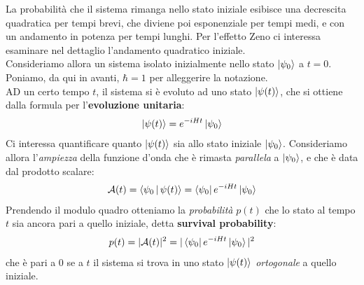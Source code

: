 \documentclass[../../InformazioneQuantistica.tex]{subfiles}
\begin{document}
La probabilità che il sistema rimanga nello stato iniziale esibisce una decrescita quadratica per tempi brevi, che diviene poi esponenziale per tempi medi, e con un andamento in potenza per tempi lunghi. Per l'effetto Zeno ci interessa esaminare nel dettaglio l'andamento quadratico iniziale.\\

Consideriamo allora un sistema isolato inizialmente nello stato $\Ket{\psi_0}$ a $t=0$. Poniamo, da qui in avanti, $\hbar=1$ per alleggerire la notazione.\\
AD un certo tempo $t$, il sistema si è evoluto ad uno stato $\Ket{\psi(t)}$, che si ottiene dalla formula per l'\textbf{evoluzione unitaria}:
\begin{align}
\Ket{\psi(t)} = e^{-iHt}\Ket{\psi_0}
\label{eqn:ev-temp}
\end{align}
Ci interessa quantificare quanto $\Ket{\psi(t)}$ sia  allo stato iniziale $\Ket{\psi_0}$. Consideriamo allora l'\textit{ampiezza} della funzione d'onda che è rimasta \textit{parallela} a $\Ket{\psi_0}$, e che è data dal prodotto scalare: 
\begin{align}
\mathcal{A}(t) = \Braket{\psi_0|\psi(t)} = \Bra{\psi_0}e^{-iHt}\Ket{\psi_0}
\label{eqn:surv-amplitude}
\end{align}
Prendendo il modulo quadro otteniamo la \textit{probabilità} $p(t)$ che lo stato al tempo $t$ sia ancora pari a quello iniziale, detta \textbf{survival probability}: 
\begin{align}
p(t) = |\mathcal{A}(t)|^2 = |\Bra{\psi_0}e^{-iHt}\Ket{\psi_0}|^2
\label{eqn:surv-prob}
\end{align}
che è pari a $0$ se a $t$ il sistema si trova in uno stato $\Ket{\psi(t)}$ \textit{ortogonale} a quello iniziale.\\
\end{document}
